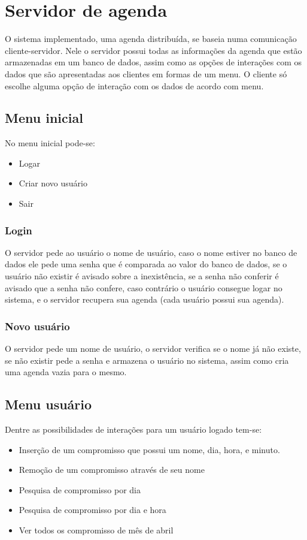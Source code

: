 \documentclass[10pt,a4paper]{article}
\begin{document}
\section{Servidor de agenda}
O sistema implementado, uma agenda distribuída, se baseia numa comunicação
cliente-servidor. Nele o servidor possui todas as informações da
agenda que estão armazenadas em um banco de dados,
assim como as opções de interações com os dados que são apresentadas
aos clientes em formas de um menu.
O cliente só escolhe alguma opção de interação com os dados de
acordo com menu.


\subsection{Menu inicial}
No menu inicial pode-se:

\begin{itemize}
\item Logar
\item Criar novo usuário
\item Sair
\end{itemize}

\subsubsection{Login}
O servidor pede ao usuário o nome de usuário, caso o nome estiver no
banco de dados ele pede uma senha que é comparada ao valor do banco de
dados, se o usuário não existir é avisado sobre a inexistência, se a
senha não conferir é avisado que a senha não confere, caso contrário o
usuário consegue logar no sistema, e o servidor recupera sua agenda (cada
usuário possui sua agenda).


\subsubsection{Novo usuário}
O servidor pede um nome de usuário, o servidor verifica se o nome já
não existe, se não existir pede a senha e armazena o usuário no
sistema, assim como cria uma agenda vazia para o mesmo.

\subsection{Menu usuário}
Dentre as possibilidades de interações para um usuário logado tem-se:

\begin{itemize}
\item Inserção de um compromisso que possui um nome, dia, hora, e minuto. 
\item Remoção de um compromisso através de seu nome
\item Pesquisa de compromisso por dia
\item Pesquisa de compromisso por dia e hora
\item Ver todos os compromisso de mês de abril
\end{itemize}
\end{document}
